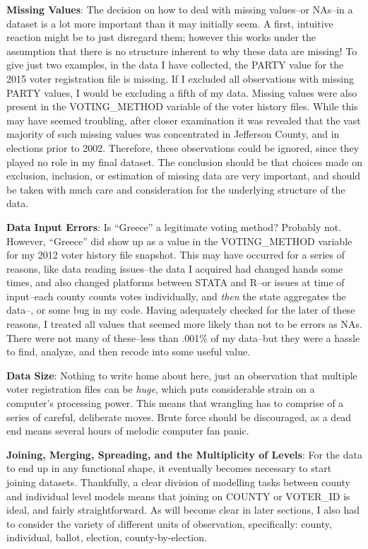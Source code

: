 \documentclass[12pt,twoside]{reedthesis}
\begin{document}
  \textbf{Missing Values}: The decision on how to deal with missing
  values--or NAs--in a dataset is a lot more important than it may
  initially seem. A first, intuitive reaction might be to just disregard
  them; however this works under the assumption that there is no structure
  inherent to why these data are missing! To give just two examples, in
  the data I have collected, the PARTY value for the 2015 voter
  registration file is missing. If I excluded all observations with
  missing PARTY values, I would be excluding a fifth of my data. Missing
  values were also present in the VOTING\_METHOD variable of the voter
  history files. While this may have seemed troubling, after closer
  examination it was revealed that the vast majority of such missing
  values was concentrated in Jefferson County, and in elections prior to
  2002. Therefore, these observations could be ignored, since they played
  no role in my final dataset. The conclusion should be that choices made
  on exclusion, inclusion, or estimation of missing data are very
  important, and should be taken with much care and consideration for the
  underlying structure of the data.
  
  \textbf{Data Input Errors}: Is ``Greece'' a legitimate voting method?
  Probably not. However, ``Greece'' did show up as a value in the
  VOTING\_METHOD variable for my 2012 voter history file snapshot. This
  may have occurred for a series of reasons, like data reading issues--the
  data I acquired had changed hands some times, and also changed platforms
  between STATA and R--or issues at time of input--each county counts
  votes individually, and \emph{then} the state aggregates the data--, or
  some bug in my code. Having adequately checked for the later of these
  reasons, I treated all values that seemed more likely than not to be
  errors as NAs. There were not many of these--less than .001\% of my
  data--but they were a hassle to find, analyze, and then recode into some
  useful value.
  
  \textbf{Data Size}: Nothing to write home about here, just an
  observation that multiple voter registration files can be \emph{huge},
  which puts considerable strain on a computer's processing power. This
  means that wrangling has to comprise of a series of careful, deliberate
  moves. Brute force should be discouraged, as a dead end means several
  hours of melodic computer fan panic.
  
  \textbf{Joining, Merging, Spreading, and the Multiplicity of Levels}:
  For the data to end up in any functional shape, it eventually becomes
  necessary to start joining datasets. Thankfully, a clear division of
  modelling tasks between county and individual level models means that
  joining on COUNTY or VOTER\_ID is ideal, and fairly straightforward. As
  will become clear in later sections, I also had to consider the variety
  of different units of observation, specifically: county, individual,
  ballot, election, county-by-election.
  
\end{document}
